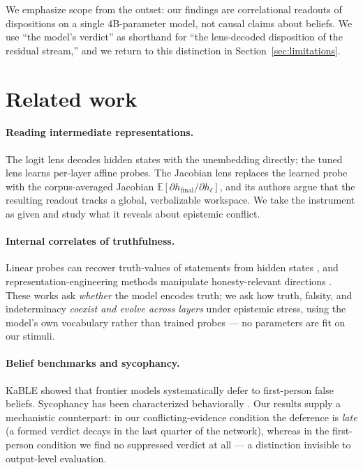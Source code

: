 \documentclass[11pt]{article}
\begin{document}
We emphasize scope from the outset: our findings are correlational readouts of
dispositions on a single 4B-parameter model, not causal claims about beliefs.
We use ``the model's verdict'' as shorthand for ``the lens-decoded disposition
of the residual stream,'' and we return to this distinction in
Section~\ref{sec:limitations}.

\section{Related work}

\paragraph{Reading intermediate representations.} The logit lens
\cite{nostalgebraist2020logit} decodes hidden states with the unembedding
directly; the tuned lens \cite{belrose2023tuned} learns per-layer affine
probes. The Jacobian lens \cite{anthropic2026workspace} replaces the learned
probe with the corpus-averaged Jacobian $\mathbb{E}[\partial h_{\text{final}} /
\partial h_\ell]$, and its authors argue that the resulting readout tracks a
global, verbalizable workspace. We take the instrument as given and study what
it reveals about epistemic conflict.

\paragraph{Internal correlates of truthfulness.} Linear probes can recover
truth-values of statements from hidden states
\cite{azaria2023internal,marks2023geometry}, and representation-engineering
methods manipulate honesty-relevant directions \cite{zou2023repe}. These works
ask \emph{whether} the model encodes truth; we ask how truth, falsity, and
indeterminacy \emph{coexist and evolve across layers} under epistemic stress,
using the model's own vocabulary rather than trained probes --- no parameters
are fit on our stimuli.

\paragraph{Belief benchmarks and sycophancy.} KaBLE \cite{suzgun2024belief}
showed that frontier models systematically defer to first-person false beliefs.
Sycophancy has been characterized behaviorally \cite{sharma2023sycophancy}.
Our results supply a mechanistic counterpart: in our conflicting-evidence
condition the deference is \emph{late} (a formed verdict decays in the last
quarter of the network), whereas in the first-person condition we find no
suppressed verdict at all --- a distinction invisible to output-level
evaluation.
\end{document}
